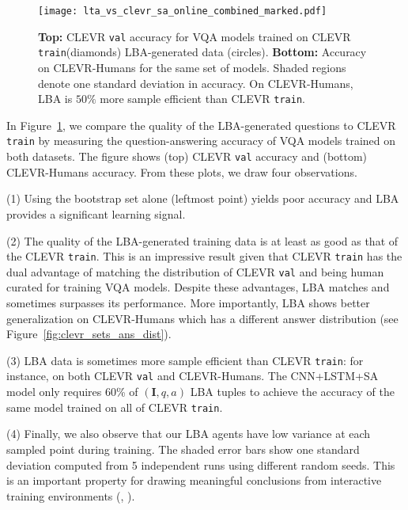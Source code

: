 \documentclass[10pt,twocolumn,letterpaper]{article}
\newcommand{\imageQApair}{(\mathbf{I}, q, a)}
\newcommand{\clevrtrain}{\texttt{train}\xspace}
\newcommand{\clevrval}{\texttt{val}\xspace}
\begin{document}
\begin{figure}
    \centering
    \texttt{[image: lta\_vs\_clevr\_sa\_online\_combined\_marked.pdf]}
    \vspace{-0.1in}
    \caption{\textbf{Top:} CLEVR \clevrval accuracy for VQA models trained on CLEVR \clevrtrain (diamonds) \vs LBA-generated data (circles). \textbf{Bottom:} Accuracy on CLEVR-Humans for the same set of models. Shaded regions denote one standard deviation in accuracy. On CLEVR-Humans, LBA is $50\%$ more sample efficient than CLEVR \clevrtrain.}
    \vspace{-0.6em}
    \label{fig:LBA_clevr_cval}
\end{figure}



In Figure~\ref{fig:LBA_clevr_cval}, we compare the quality of the LBA-generated questions to CLEVR \clevrtrain by measuring the question-answering accuracy of VQA models trained on both datasets. The figure shows (top) CLEVR \clevrval accuracy and (bottom) CLEVR-Humans accuracy.
From these plots, we draw four observations.
\par \noindent (1) Using the bootstrap set alone (leftmost point) yields poor accuracy and LBA provides a significant learning signal.
\par \noindent (2) The quality of the LBA-generated training data is at least as good as that of the CLEVR \clevrtrain. This is an impressive result given that CLEVR \clevrtrain has the dual advantage of matching the distribution of CLEVR \clevrval and being human curated for training VQA models. Despite these advantages, LBA matches and sometimes surpasses its performance. More importantly, LBA shows better generalization on CLEVR-Humans which has a different answer distribution (see Figure~\ref{fig:clevr_sets_ans_dist}).
\par \noindent (3) LBA data is sometimes more sample efficient than CLEVR \clevrtrain: for instance, on both CLEVR \clevrval and CLEVR-Humans. The CNN+LSTM+SA model only requires 60\% of $\imageQApair$ LBA tuples to achieve the accuracy of the same model trained on all of CLEVR \clevrtrain.
\par \noindent (4) Finally, we also observe that our LBA agents have low variance at each sampled point during training. The shaded error bars show one standard deviation computed from 5 independent runs using different random seeds. This is an important property for drawing meaningful conclusions from interactive training environments (\cf, \cite{henderson2017deep}).
\end{document}
